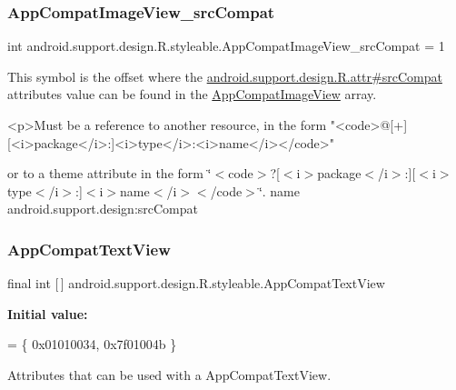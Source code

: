 \subsubsection{\texorpdfstring{App\+Compat\+Image\+View\+\_\+src\+Compat}{AppCompatImageView\_srcCompat}}
{\footnotesize\ttfamily int android.\+support.\+design.\+R.\+styleable.\+App\+Compat\+Image\+View\+\_\+src\+Compat = 1\hspace{0.3cm}{\ttfamily [static]}}

This symbol is the offset where the \hyperlink{classandroid_1_1support_1_1design_1_1R_1_1attr_aec1af09f1f86e1448a52a89a90842d29}{android.\+support.\+design.\+R.\+attr\#src\+Compat} attribute\textquotesingle{}s value can be found in the \hyperlink{classandroid_1_1support_1_1design_1_1R_1_1styleable_ada1b5e4475936c9e01181fdb4d8cb6c9}{App\+Compat\+Image\+View} array.

\begin{DoxyVerb}      <p>Must be a reference to another resource, in the form "<code>@[+][<i>package</i>:]<i>type</i>:<i>name</i></code>"
\end{DoxyVerb}
 or to a theme attribute in the form \char`\"{}$<$code$>$?\mbox{[}$<$i$>$package$<$/i$>$\+:\mbox{]}\mbox{[}$<$i$>$type$<$/i$>$\+:\mbox{]}$<$i$>$name$<$/i$>$$<$/code$>$\char`\"{}.  name android.\+support.\+design\+:src\+Compat \mbox{\label{classandroid_1_1support_1_1design_1_1R_1_1styleable_a4f8449fe92fa53cd1fd4547247fe52b6}} 
\subsubsection{\texorpdfstring{App\+Compat\+Text\+View}{AppCompatTextView}}
{\footnotesize\ttfamily final int \mbox{[}$\,$\mbox{]} android.\+support.\+design.\+R.\+styleable.\+App\+Compat\+Text\+View\hspace{0.3cm}{\ttfamily [static]}}

{\bfseries Initial value\+:}
\begin{DoxyCode}
= \{
            0x01010034, 0x7f01004b
        \}
\end{DoxyCode}
Attributes that can be used with a App\+Compat\+Text\+View. 

